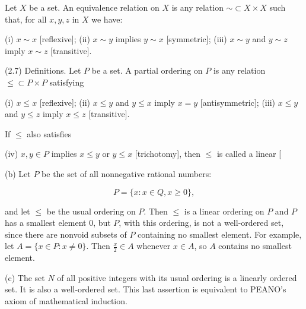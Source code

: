 Let $X$ be a set. An equivalence relation on $X$ is any relation $\sim \subset X \times X$ such that, for all $x, y, z$ in $X$ we have:

(i) $x \sim x$ [reflexive];
(ii) $x \sim y$ implies $y \sim x$ [symmetric];
(iii) $x \sim y$ and $y \sim z$ imply $x \sim z$ [transitive].

(2.7) Definitions. Let $P$ be a set. A partial ordering on $P$ is any relation $\leq \subset P \times P$ satisfying

(i) $x \leq x$ [reflexive];
(ii) $x \leq y$ and $y \leq x$ imply $x = y$ [antisymmetric];
(iii) $x \leq y$ and $y \leq z$ imply $x \leq z$ [transitive].

If $\leq$ also satisfies

(iv) $x, y \in P$ implies $x \leq y$ or $y \leq x$ [trichotomy], then $\leq$ is called a linear [

(b) Let $P$ be the set of all nonnegative rational numbers:

$$P = \{x : x \in Q, x \geq 0\},$$

and let $\leq$ be the usual ordering on $P$. Then $\leq$ is a linear ordering on $P$ and $P$ has a smallest element 0, but $P$, with this ordering, is not a well-ordered set, since there are nonvoid subsets of $P$ containing no smallest element. For example, let $A = \{x \in P : x \neq 0\}$. Then $\frac{x}{2} \in A$ whenever $x \in A$, so $A$ contains no smallest element.

(c) The set $N$ of all positive integers with its usual ordering is a linearly ordered set. It is also a well-ordered set. This last assertion is equivalent to PEANO’s axiom of mathematical induction.